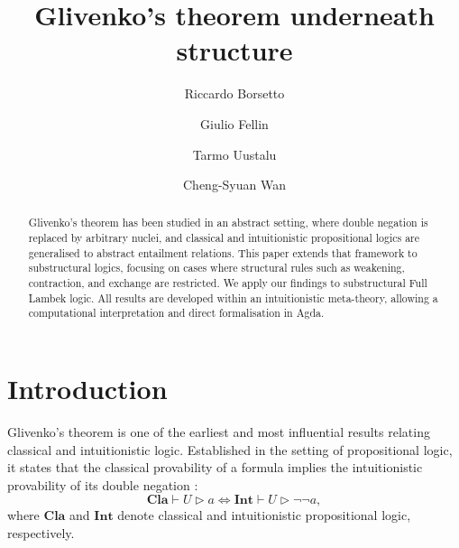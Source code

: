 \documentclass[runningheads]{llncs}
\newcommand{\Cl}{\mathbf{Cla}}
\newcommand{\Int}{\mathbf{Int}}
\begin{document}
%
\title{Glivenko's theorem underneath structure}
%
%
\author{
	Riccardo Borsetto \and
	Giulio Fellin \and
	Tarmo Uustalu \and
	Cheng-Syuan Wan}
%
%
%
\maketitle              %
%
\begin{abstract}
	Glivenko's theorem has been studied in an abstract setting, where double negation is replaced by arbitrary nuclei, and classical and intuitionistic propositional logics are generalised to abstract entailment relations. This paper extends that framework to substructural logics, focusing on cases where structural rules such as weakening, contraction, and exchange are restricted. We apply our findings to substructural Full Lambek logic. All results are developed within an intuitionistic meta-theory, allowing a computational interpretation and direct formalisation in Agda.
	
\end{abstract}
%
%
%
\section{Introduction}

Glivenko's theorem is one of the earliest and most influential results relating classical and intuitionistic logic. Established in the setting of propositional logic, it states that the classical provability of a formula implies the intuitionistic provability of its double negation \cite{gliv28,gliv29}:
\[
\Cl \vdash U \rhd a \iff \Int \vdash U \rhd \neg\neg a,
\]
where $\Cl$ and $\Int$ denote classical and intuitionistic propositional logic, respectively.
\end{document}
